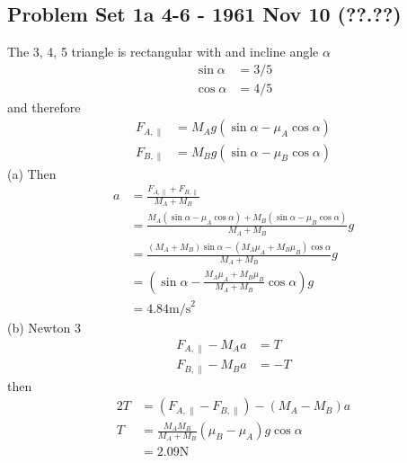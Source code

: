 \documentclass[10pt,a4paper]{book}
\theoremstyle{definition}
\begin{document}
\subsection{Problem Set 1a 4-6 - 1961 Nov 10 (??.??)}
The 3, 4, 5 triangle is rectangular with and incline angle $\alpha$
\begin{align}
\sin\alpha&=3/5\\
\cos\alpha&=4/5
\end{align}
and therefore
\begin{align}
F_{A,\parallel}&=M_Ag(\sin\alpha-\mu_A\cos\alpha)\\
F_{B,\parallel}&=M_Bg(\sin\alpha-\mu_B\cos\alpha)
\end{align}
(a) Then
\begin{align}
a
&=\frac{F_{A,\parallel}+F_{B,\parallel}}{M_A+M_B}\\
&=\frac{M_A(\sin\alpha-\mu_A\cos\alpha)+M_B(\sin\alpha-\mu_B\cos\alpha)}{M_A+M_B}g\\
&=\frac{(M_A+M_B)\sin\alpha-(M_A\mu_A+M_B\mu_B)\cos\alpha}{M_A+M_B}g\\
&=\left(\sin\alpha-\frac{M_A\mu_A+M_B\mu_B}{M_A+M_B}\cos\alpha\right)g\\
&=4.84\text{m/s}^2
\end{align}
(b) Newton 3
\begin{align}
F_{A,\parallel}-M_Aa&=T\\
F_{B,\parallel}-M_Ba&=-T
\end{align}
then
\begin{align}
2T
&=(F_{A,\parallel}-F_{B,\parallel})-(M_A-M_B)a\\
T&=\frac{M_AM_B}{M_A+M_B}(\mu_B-\mu_A)g\cos\alpha\\
&=2.09\text{N}
\end{align}
\end{document}
